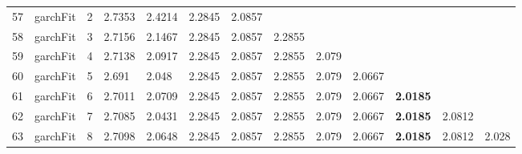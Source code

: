 \documentclass[10pt,a4paper]{article}
\begin{document}
\begin{table}[ht]
\begin{tabular}{rlrllllllllll}
  57 & garchFit &     2 & 2.7353 & 2.4214 & 2.2845 & 2.0857 &  &  &  &  &  &  \\ 
  58 & garchFit &     3 & 2.7156 & 2.1467 & 2.2845 & 2.0857 & 2.2855 &  &  &  &  &  \\ 
  59 & garchFit &     4 & 2.7138 & 2.0917 & 2.2845 & 2.0857 & 2.2855 & 2.079 &  &  &  &  \\ 
  60 & garchFit &     5 & 2.691 & 2.048 & 2.2845 & 2.0857 & 2.2855 & 2.079 & 2.0667 &  &  &  \\ 
  61 & garchFit &     6 & 2.7011 & 2.0709 & 2.2845 & 2.0857 & 2.2855 & 2.079 & 2.0667 & \textbf{2.0185} &  &  \\ 
  62 & garchFit &     7 & 2.7085 & 2.0431 & 2.2845 & 2.0857 & 2.2855 & 2.079 & 2.0667 & \textbf{2.0185} & 2.0812 &  \\ 
  63 & garchFit &     8 & 2.7098 & 2.0648 & 2.2845 & 2.0857 & 2.2855 & 2.079 & 2.0667 & \textbf{2.0185} & 2.0812 & 2.028 \\ 
   \hline
\end{tabular}
\end{table}
\end{document}
